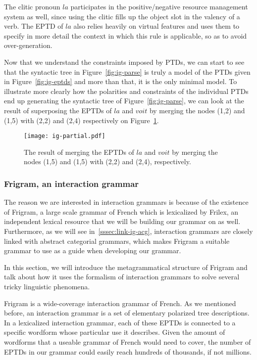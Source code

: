 The clitic pronoun $la$ participates in the positive/negative resource
management system as well, since using the clitic fills up the object
slot in the valency of a verb. The EPTD of $la$ also relies heavily on
virtual features and uses them to specify in more detail the context in
which this rule is applicable, so as to avoid over-generation.

Now that we understand the constraints imposed by PTDs, we can start to
see that the syntactic tree in Figure~\ref{fig:ig-parse} is truly a
model of the PTDs given in Figure~\ref{fig:ig-eptds} and more than that,
it is the only minimal model. To illustrate more clearly how the
polarities and constraints of the individual PTDs end up generating the
syntactic tree of Figure~\ref{fig:ig-parse}, we can look at the result
of superposing the EPTDs of $la$ and $voit$ by merging the nodes (1,2)
and (1,5) with (2,2) and (2,4) respectively on
Figure~\ref{fig:ig-partial}.

\begin{figure}
  \centering
  \texttt{[image: ig-partial.pdf]}
  \caption{\label{fig:ig-partial} The result of merging the EPTDs of
    $la$ and $voit$ by merging the nodes (1,5) and (1,5) with (2,2) and
    (2,4), respectively.}
\end{figure}

\subsubsection{Frigram, an interaction grammar}

The reason we are interested in interaction grammars is because of the
existence of Frigram, a large scale grammar of French which is
lexicalized by Frilex, an independent lexical resource that we will be
building our grammar on as well. Furthermore, as we will see
in~\ref{sssec:link-ig-acg}, interaction grammars are closely linked with
abstract categorial grammars, which makes Frigram a suitable grammar to
use as a guide when developing our grammar.

In this section, we will introduce the metagrammatical structure of
Frigram and talk about how it uses the formalism of interaction grammars
to solve several tricky linguistic phenomena.


Frigram is a wide-coverage interaction grammar of French. As we
mentioned before, an interaction grammar is a set of elementary
polarized tree descriptions. In a lexicalized interaction grammar, each
of these EPTDs is connected to a specific wordform whose particular use
it describes. Given the amount of wordforms that a useable grammar of
French would need to cover, the number of EPTDs in our grammar could
easily reach hundreds of thousands, if not millions.

